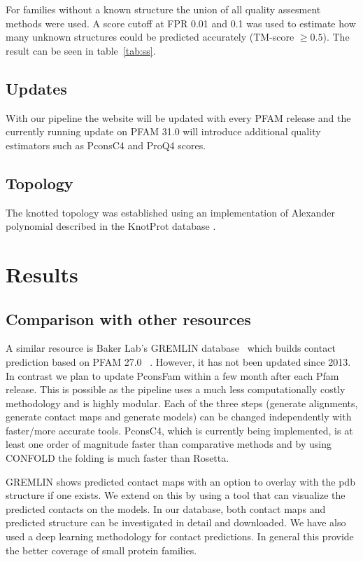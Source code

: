 \documentclass[a4,center,fleqn]{NAR}
\begin{document}
For families without a known structure the union of all quality assesment methods were used.
A score cutoff at FPR 0.01 and 0.1 was used to estimate how many unknown structures
could be predicted accurately (TM-score $\ge 0.5$). The result can be seen in table~\ref{tab:ss}.
\subsection{Updates}

With our pipeline the website will be updated with every PFAM release
and the currently running update on PFAM 31.0 will introduce
additional quality estimators such as PconsC4 and ProQ4
scores. 

\subsection{Topology}
The knotted topology was established using an implementation
of Alexander polynomial described in the KnotProt database \cite{jamroz2014knotprot}.

\section{Results}

\subsection{Comparison with other resources}

A similar resource is Baker Lab’s GREMLIN database~\cite{Kamisetty2013} which builds contact prediction based on
PFAM 27.0~\cite{Sonnhammer:1997} . However, it has not been updated since
2013. In contrast we plan to update PconsFam within a few month after
each Pfam release. This is possible as the pipeline uses a much less
computationally costly methodology and is highly modular. Each of the three steps
(generate alignments, generate contact maps and generate models) can be changed
independently with faster/more accurate tools. PconsC4, which is currently
being implemented, is at least one order of
magnitude faster than comparative methods and by using CONFOLD the
folding is much faster than Rosetta.


GREMLIN shows predicted contact maps with an option to overlay with
the pdb structure if one exists. We extend on this by using a tool
that can visualize the predicted contacts on the models. In our
database, both contact maps and predicted structure can be
investigated in detail and downloaded.  We have also used a deep
learning methodology for contact predictions. In general this provide
the better coverage of small protein families.
\end{document}
